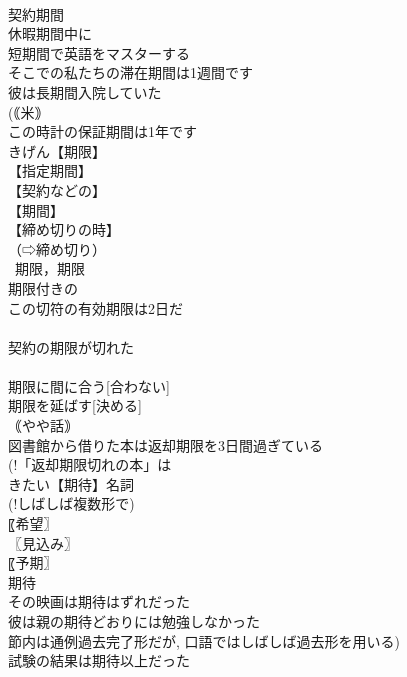 \documentclass[8pt]{extreport}
\begin{document}
\begin{CJK}{UTF8}{min}
\\	契約期間
\\	休暇期間中に
\\	短期間で英語をマスターする
\\	そこでの私たちの滞在期間は1週間です
\\	彼は長期間入院していた
\\	(｟米｠ 
\\	この時計の保証期間は1年です
\\	きげん【期限】
\\	【指定期間】
\\	【契約などの】
\\	【期間】
\\	【締め切りの時】
\\	（⇨締め切り）
\\	~期限，期限~
\\	期限付きの
\\	この切符の有効期限は2日だ
\\	[｟書｠ 
\\	(!「有効期限二日の切符」は 
\\	納税期限まであと10日しかない
\\	期限が[は]
\\	契約の期限が切れた
\\	[｟やや書｠ 
\\	手形の期限が5月19日に来る
\\	会話
\\	「その請求書の支払い期限はいつですか」「5月10日です」
\\	期限に[を]
\\	期限に間に合う[合わない]
\\	期限を延ばす[決める]
\\	｟やや話｠ 
\\	図書館から借りた本は返却期限を3日間過ぎている
\\	(!「返却期限切れの本」は 
\\	きたい【期待】名詞
\\	(!しばしば複数形で) 
\\	〖希望〗
\\	〖見込み〗
\\	〖予期〗
\\	期待~
\\	その映画は期待はずれだった
\\	彼は親の期待どおりには勉強しなかった
\\	節内は通例過去完了形だが, 口語ではしばしば過去形を用いる)
\\	試験の結果は期待以上だった

\end{CJK}
\end{document}
